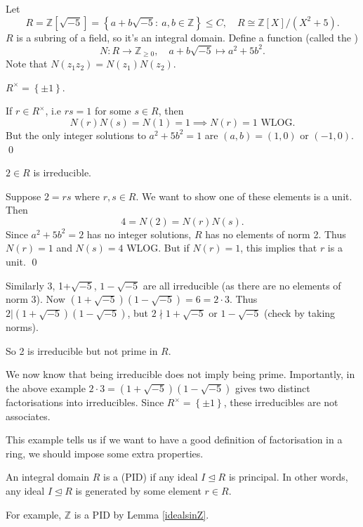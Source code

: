 \documentclass[egregdoesnotlikesansseriftitles,a4paper]{scrartcl}
\begin{document}
\begin{example*}
       Let \[
            R=\mathbb{Z}[\sqrt{-5}]= \left\{a+b\sqrt{-5} : \ a,b \in \mathbb{Z}\right\} \leq C, \quad R \cong \mathbb{Z}[X]/(X^2+5)
       .\] $R$ is a subring of a field, so it's an integral domain. Define a function (called the ) \[
       N: R \rightarrow \mathbb{Z}_{\geq 0}, \quad a+b \sqrt{-5} \mapsto a^2+5b^2
       .\] Note that $N (z_1 z_2 )=N (z_1 )N (z_2 )$. 
       \begin{claim}
             $R^{\times }=\left\{\pm 1\right\}$.
       \end{claim}
       \begin{prooff}
             If $r \in R^{\times }$, i.e $rs =1$ for some $s \in R$, then \[
             N (r)N (s)=N (1)=1 \implies N (r)=1 \text{ WLOG} 
             .\] But the only integer solutions to $a^2+5b^2=1$ are $(a,b)=(1,0)$ or $(-1,0)$.  \hfill \qed
       \end{prooff}
       \begin{claim}
             $2 \in R$ is irreducible.
       \end{claim}
       \begin{prooff}
             Suppose $2=rs $ where $r,s \in R $. We want to show one of these elements is a unit. Then \[
             4= N (2)=N (r)N (s)
             .\] Since $a^2+5b^2=2$ has no integer solutions, $R$ has no elements of norm 2. Thus $N (r)=1$ and $N (s)=4$ WLOG. But if $N (r)=1$, this implies that $r$ is a unit. \hfill \qed
       \end{prooff}
       Similarly 3, 1+$\sqrt{-5} $, $1- \sqrt{-5} $ are all irreducible (as there are no elements of norm 3). Now $(1+\sqrt{-5} )(1-\sqrt{-5} )=6=2 \cdot 3$. Thus $2| (1+\sqrt{-5} )(1-\sqrt{-5} )$, but $2 \nmid 1+\sqrt{-5}$ or $1- \sqrt{-5} $ (check by taking norms). 
       
       So 2 is irreducible but not prime in $R$.
\end{example*}
\begin{remarks}
       We now know that being irreducible does not imply being prime. Importantly, in the above example $2 \cdot 3= (1+\sqrt{-5} )(1-\sqrt{-5} )$ gives two distinct factorisations into irreducibles. Since $R^{\times}=\left\{\pm 1\right\}$, these irreducibles are not associates.
\end{remarks}
This example tells us if we want to have a good definition of factorisation in a ring, we should impose some extra properties.
\begin{definition*}
       An integral domain $R$ is a  (PID) if any ideal $I \unlhd R$ is principal. In other words, any ideal $I \unlhd R$ is generated by some element $r \in R$.

       For example, $\mathbb{Z}$ is a PID by Lemma \ref{idealsinZ}.
\end{definition*}
\end{document}
